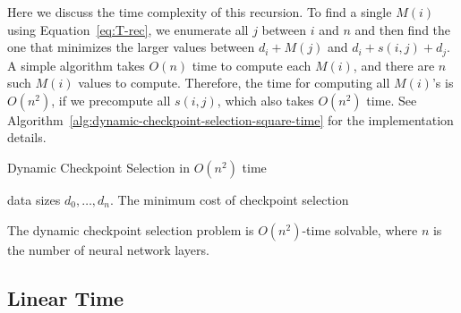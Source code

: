 Here we discuss the time complexity of this recursion.
To find a single $M(i)$ using Equation~\ref{eq:T-rec}, we enumerate all $j$ between $i$ and $n$ and then find the one that minimizes the larger values between $d_i + M(j)$ and $d_i + s(i, j) + d_j$.
A simple algorithm takes $O(n)$ time to compute each $M(i)$, and there are $n$ such $M(i)$ values to compute.
Therefore, the time for computing all $M(i)$'s is $O(n^2)$, if we precompute all $s(i,j)$, which also takes $O(n^2)$ time.
See Algorithm~\ref{alg:dynamic-checkpoint-selection-square-time} for the implementation details.

\begin{algorithm}[h!tb]
\begin{algorithmic}
\caption{Dynamic Checkpoint Selection in $O(n^2)$ time}
\label{alg:dynamic-checkpoint-selection-square-time}
\Require data sizes $d_0, \ldots, d_n$.
\Ensure The minimum cost of checkpoint selection
\EndFor
\EndFor
{} 
\end{algorithmic}
\end{algorithm}

\begin{theorem}
\label{thm:dynamic-checkpoint-selection-square-time}
The dynamic checkpoint selection problem is $O(n^2)$-time solvable, where $n$ is the number of neural network layers.
\end{theorem}

\subsection{Linear Time}



